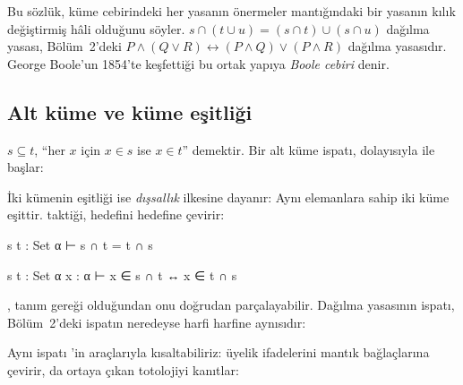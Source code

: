 \begin{onemlifikir}
Bu sözlük, küme cebirindeki her yasanın önermeler mantığındaki bir
yasanın kılık değiştirmiş hâli olduğunu söyler. $s \cap (t \cup u) =
(s \cap t) \cup (s \cap u)$ dağılma yasası, Bölüm~2'deki
$P \wedge (Q \vee R) \leftrightarrow (P \wedge Q) \vee (P \wedge R)$
dağılma yasasıdır. George Boole'un 1854'te keşfettiği bu ortak yapıya
\emph{Boole cebiri} denir.
\end{onemlifikir}

\subsection{Alt küme ve küme eşitliği}

$s \subseteq t$, ``her $x$ için $x \in s$ ise $x \in t$'' demektir. Bir
alt küme ispatı, dolayısıyla  ile başlar:


\noindent İki kümenin eşitliği ise \emph{dışsallık} ilkesine dayanır:
Aynı elemanlara sahip iki küme eşittir.  taktiği,
 hedefini  hedefine çevirir:


\begin{hedefgecisi}
\begin{hedefdurumu}
s t : Set α
⊢ s ∩ t = t ∩ s
\end{hedefdurumu}
\sonra
\begin{hedefdurumu}
s t : Set α
x : α
⊢ x ∈ s ∩ t ↔ x ∈ t ∩ s
\end{hedefdurumu}
\end{hedefgecisi}

\noindent {}, tanım gereği  olduğundan
 onu doğrudan parçalayabilir. Dağılma yasasının
ispatı, Bölüm~2'deki ispatın neredeyse harfi harfine aynısıdır:


\noindent Aynı ispatı \Mathlib{}'in araçlarıyla kısaltabiliriz:
 üyelik ifadelerini mantık bağlaçlarına çevirir,
 da ortaya çıkan totolojiyi kanıtlar:



